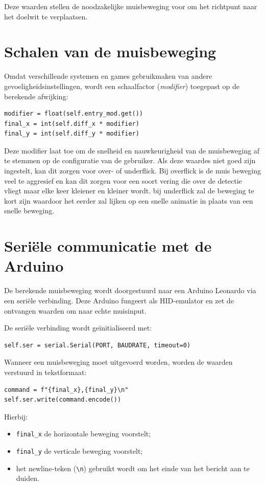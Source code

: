 Deze waarden stellen de noodzakelijke muisbeweging voor om het richtpunt naar het doelwit te verplaatsen.

\section{Schalen van de muisbeweging}

Omdat verschillende systemen en games gebruikmaken van andere gevoeligheidsinstellingen, wordt een schaalfactor (\textit{modifier}) toegepast op de berekende afwijking:

\begin{verbatim}
modifier = float(self.entry_mod.get())
final_x = int(self.diff_x * modifier)
final_y = int(self.diff_y * modifier)
\end{verbatim}

Deze modifier laat toe om de snelheid en nauwkeurigheid van de muisbeweging af te stemmen op de configuratie van de gebruiker. Als deze waardes niet goed zijn ingestelt, kan dit zorgen voor over- of underflick. Bij overflick is de muis beweging veel te aggresief en kan dit zorgen voor een soort vering die over de detectie vliegt maar elke keer kleiener en kleiner wordt. bij underflick zal de beweging te kort zijn waardoor het eerder zal lijken op een snelle animatie in plaats van een snelle beweging.

\section{Seriële communicatie met de Arduino}

De berekende muisbeweging wordt doorgestuurd naar een Arduino Leonardo via een seriële verbinding. Deze Arduino fungeert als HID-emulator en zet de ontvangen waarden om naar echte muisinput.

De seriële verbinding wordt geïnitialiseerd met:

\begin{verbatim}
self.ser = serial.Serial(PORT, BAUDRATE, timeout=0)
\end{verbatim}

Wanneer een muisbeweging moet uitgevoerd worden, worden de waarden verstuurd in tekstformaat:

\begin{verbatim}
command = f"{final_x},{final_y}\n"
self.ser.write(command.encode())
\end{verbatim}

Hierbij:
\begin{itemize}
    \item \texttt{final\_x} de horizontale beweging voorstelt;
    \item \texttt{final\_y} de verticale beweging voorstelt;
    \item het newline-teken (\texttt{\textbackslash n}) gebruikt wordt om het einde van het bericht aan te duiden.
\end{itemize}

